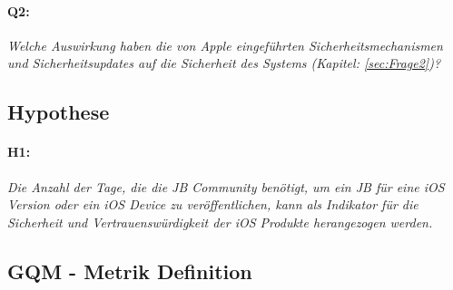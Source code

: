  \paragraph{Q2:} \textit{\glqq Welche Auswirkung haben die von Apple eingeführten Sicherheitsmechanismen und Sicherheitsupdates auf die Sicherheit des Systems (Kapitel: \ref{sec:Frage2})?\grqq{}}
        
\subsection{Hypothese}
\label{sec:GQMHypothese}
\paragraph{H1:} \textit{\glqq Die Anzahl der Tage, die die JB Community benötigt, um ein JB für eine iOS Version oder ein iOS Device zu veröffentlichen, kann als Indikator für die Sicherheit und Vertrauenswürdigkeit der iOS Produkte herangezogen werden.\grqq{}}

\subsection{GQM - Metrik Definition}
\label{sec:GQMMetrik}

